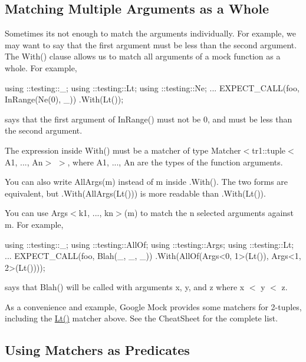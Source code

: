 \subsection*{Matching Multiple Arguments as a Whole}

Sometimes it\textquotesingle{}s not enough to match the arguments individually. For example, we may want to say that the first argument must be less than the second argument. The {\ttfamily With()} clause allows us to match all arguments of a mock function as a whole. For example,


\begin{DoxyCode}
using ::testing::\_;
using ::testing::Lt;
using ::testing::Ne;
...
  EXPECT\_CALL(foo, InRange(Ne(0), \_))
      .With(Lt());
\end{DoxyCode}


says that the first argument of {\ttfamily In\+Range()} must not be 0, and must be less than the second argument.

The expression inside {\ttfamily With()} must be a matcher of type {\ttfamily Matcher$<$tr1\+::tuple$<$A1, ..., An$>$ $>$}, where {\ttfamily A1}, ..., {\ttfamily An} are the types of the function arguments.

You can also write {\ttfamily All\+Args(m)} instead of {\ttfamily m} inside {\ttfamily .With()}. The two forms are equivalent, but {\ttfamily .With(All\+Args(\+Lt()))} is more readable than {\ttfamily .With(\+Lt())}.

You can use {\ttfamily Args$<$k1, ..., kn$>$(m)} to match the {\ttfamily n} selected arguments against {\ttfamily m}. For example,


\begin{DoxyCode}
using ::testing::\_;
using ::testing::AllOf;
using ::testing::Args;
using ::testing::Lt;
...
  EXPECT\_CALL(foo, Blah(\_, \_, \_))
      .With(AllOf(Args<0, 1>(Lt()), Args<1, 2>(Lt())));
\end{DoxyCode}


says that {\ttfamily Blah()} will be called with arguments {\ttfamily x}, {\ttfamily y}, and {\ttfamily z} where {\ttfamily x $<$ y $<$ z}.

As a convenience and example, Google Mock provides some matchers for 2-\/tuples, including the {\ttfamily \hyperlink{namespacetesting_ad621459957a8bcdd3c256b7940ecbf99}{Lt()}} matcher above. See the Cheat\+Sheet for the complete list.

\subsection*{Using Matchers as Predicates}

